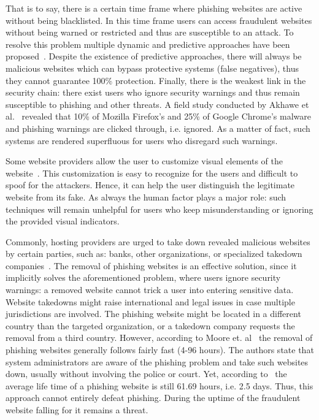 \begin{description}[leftmargin=0cm]
 That is to say, there is a certain time frame where phishing websites are active without being blacklisted.
 In this time frame users can access fraudulent websites without being warned or restricted and thus are susceptible to an attack.
 To resolve this problem multiple dynamic and predictive approaches have been proposed~\cite{prakash2010phishnet, obied2009fraudulent, balzarotti2012proactive}.
Despite the existence of predictive approaches, there will always be malicious websites which can bypass protective systems (false negatives), thus they cannot guarantee 100\% protection. 
  Finally, there is the weakest link in the security chain: there exist users who ignore security warnings and thus remain susceptible to phishing and other threats.
A field study conducted by Akhawe et al.~\cite{akhawe2013alice} revealed that 10\% of Mozilla Firefox's and 25\% of Google Chrome's malware and phishing warnings are clicked through, i.e. ignored.
 As a matter of fact, such systems are rendered superfluous for users who disregard such warnings.
	\item[Visual Distinction of Websites:] Some website providers allow the user to customize visual elements of the website~\cite{dhamija2005battle}.
This customization is easy to recognize for the users and difficult to spoof for the attackers.
Hence, it can help the user distinguish the legitimate website from its fake.
As always the human factor plays a major role: such techniques will remain unhelpful for users who keep misunderstanding or ignoring the provided visual indicators. 

	\item[Website Takedowns:] Commonly, hosting providers are urged to take down revealed malicious websites by certain parties, such as: banks, other organizations, or specialized takedown companies~\cite{moore2007examining}. The removal of phishing websites is an effective solution, since it implicitly solves the aforementioned problem, where users ignore security warnings: a removed website cannot trick a user into entering sensitive data.
Website takedowns might raise international and legal issues in case multiple jurisdictions are involved.
The phishing website might be located in a different country than the targeted organization, or a takedown company requests the removal from a third country.
However, according to Moore et. al~\cite{mooretakedown} the removal of phishing websites generally follows fairly fast (4-96 hours).
The authors state that system administrators are aware of the phishing problem and take such websites down, usually without involving the police or court.
Yet, according to~\cite{moore2007examining} the average life time of a phishing website is still 61.69 hours, i.e. 2.5 days.
Thus, this approach cannot entirely defeat phishing. During the uptime of the fraudulent website falling for it remains a threat.
\end{description}


